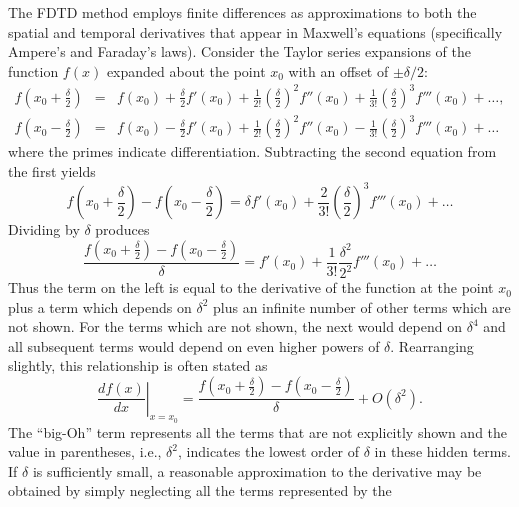 The FDTD method employs finite differences as approximations to both
the spatial and temporal derivatives that appear in Maxwell's
equations (specifically Ampere's and Faraday's laws).  Consider the
Taylor series expansions of the function $f(x)$ expanded about the
point $x_0$ with an offset of $\pm\delta/2$:
\begin{eqnarray}
  f\!\left(x_0+\frac{\delta}{2}\right) &=&
    f(x_0) + \frac{\delta}{2} f'(x_0) +
        \frac{1}{2!}\left(\frac{\delta}{2}\right)^2 f''(x_0) + 
        \frac{1}{3!}\left(\frac{\delta}{2}\right)^3 f'''(x_0) + \ldots,
  \\
  f\!\left(x_0-\frac{\delta}{2}\right) &=&
    f(x_0) - \frac{\delta}{2} f'(x_0) +
        \frac{1}{2!}\left(\frac{\delta}{2}\right)^2 f''(x_0) -
        \frac{1}{3!}\left(\frac{\delta}{2}\right)^3 f'''(x_0) + \ldots
\end{eqnarray}
where the primes indicate differentiation.  Subtracting the second
equation from the first yields
\begin{equation}
  f\!\left(x_0+\frac{\delta}{2}\right) -
  f\!\left(x_0-\frac{\delta}{2}\right) = 
   \delta f'(x_0) +
        \frac{2}{3!}\left(\frac{\delta}{2}\right)^3 f'''(x_0) + \ldots
\end{equation}
Dividing by $\delta$ produces
\begin{equation}
  \frac{f\!\left(x_0+\frac{\delta}{2}\right) -
        f\!\left(x_0-\frac{\delta}{2}\right)}{\delta} = 
   f'(x_0) +
        \frac{1}{3!}\frac{\delta^2}{2^2} f'''(x_0) + \ldots
\end{equation}
Thus the term on the left is equal to the derivative of the function
at the point $x_0$ plus a term which depends on $\delta^2$ plus an
infinite number of other terms which are not shown.  For the terms
which are not shown, the next would depend on $\delta^4$ and all
subsequent terms would depend on even higher powers of $\delta$.
Rearranging slightly, this relationship is often stated as
\begin{equation}
  \left.\frac{df(x)}{dx}\right|_{x=x_0} = 
  \frac{f\!\left(x_0+\frac{\delta}{2}\right) -
        f\!\left(x_0-\frac{\delta}{2}\right)}{\delta} + O(\delta^2).
\end{equation}
The ``big-Oh'' term represents all the terms that are not explicitly
shown and the value in parentheses, i.e., $\delta^2$, indicates the
lowest order of $\delta$ in these hidden terms.  If $\delta$ is
sufficiently small, a reasonable approximation to the derivative may
be obtained by simply neglecting all the terms represented by the
